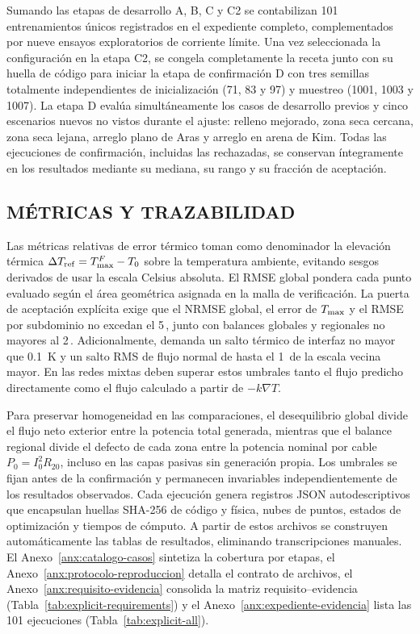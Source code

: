 Sumando las etapas de desarrollo A, B, C y C2 se contabilizan 101 entrenamientos únicos registrados en el expediente completo, complementados por nueve ensayos exploratorios de corriente límite. Una vez seleccionada la configuración en la etapa C2, se congela completamente la receta junto con su huella de código para iniciar la etapa de confirmación D con tres semillas totalmente independientes de inicialización (71, 83 y 97) y muestreo (1001, 1003 y 1007). La etapa D evalúa simultáneamente los casos de desarrollo previos y cinco escenarios nuevos no vistos durante el ajuste: relleno mejorado, zona seca cercana, zona seca lejana, arreglo plano de Aras y arreglo en arena de Kim. Todas las ejecuciones de confirmación, incluidas las rechazadas, se conservan íntegramente en los resultados mediante su mediana, su rango y su fracción de aceptación.

\subsection{MÉTRICAS Y TRAZABILIDAD}

Las métricas relativas de error térmico toman como denominador la elevación térmica $\Delta T_{\mathrm{ref}}=T_{\max}^F - T_0$ sobre la temperatura ambiente, evitando sesgos derivados de usar la escala Celsius absoluta. El RMSE global pondera cada punto evaluado según el área geométrica asignada en la malla de verificación. La puerta de aceptación explícita exige que el NRMSE global, el error de $T_{\max}$ y el RMSE por subdominio no excedan el 5\,\pct{}, junto con balances globales y regionales no mayores al 2\,\pct{}. Adicionalmente, demanda un salto térmico de interfaz no mayor que \SI{0,1}{\kelvin} y un salto RMS de flujo normal de hasta el 1\,\pct{} de la escala vecina mayor. En las redes mixtas deben superar estos umbrales tanto el flujo predicho directamente como el flujo calculado a partir de $-k\nabla T$.

Para preservar homogeneidad en las comparaciones, el desequilibrio global divide el flujo neto exterior entre la potencia total generada, mientras que el balance regional divide el defecto de cada zona entre la potencia nominal por cable $P_0=I_0^2R_{20}$, incluso en las capas pasivas sin generación propia. Los umbrales se fijan antes de la confirmación y permanecen invariables independientemente de los resultados observados. Cada ejecución genera registros JSON autodescriptivos que encapsulan huellas SHA-256 de código y física, nubes de puntos, estados de optimización y tiempos de cómputo. A partir de estos archivos se construyen automáticamente las tablas de resultados, eliminando transcripciones manuales. El Anexo~\ref{anx:catalogo-casos} sintetiza la cobertura por etapas, el Anexo~\ref{anx:protocolo-reproduccion} detalla el contrato de archivos, el Anexo~\ref{anx:requisito-evidencia} consolida la matriz requisito--evidencia (Tabla~\ref{tab:explicit-requirements}) y el Anexo~\ref{anx:expediente-evidencia} lista las 101 ejecuciones (Tabla~\ref{tab:explicit-all}).

